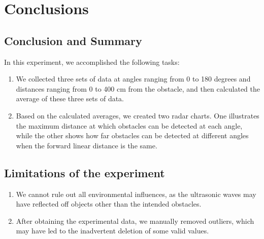\section{Conclusions}
\label{sec:conclusions}
\subsection{Conclusion and Summary}
In this experiment, we accomplished the following tasks:
\begin{enumerate}
  \item We collected three sets of data at angles ranging from 0 to 180 degrees and
    distances ranging from 0 to 400 cm from the obstacle, and then calculated the
    average of these three sets of data.
  \item Based on the calculated averages, we created two radar charts.
    One illustrates the maximum distance at which obstacles can be detected at each angle, while
    the other shows how far obstacles can be detected at different angles when
    the forward linear distance is the same.
\end{enumerate}

\subsection{Limitations of the experiment}
\begin{enumerate}
  \item We cannot rule out all environmental influences, as the ultrasonic waves may
have reflected off objects other than the intended obstacles.
  \item After obtaining the experimental data, we manually removed outliers, which may
have led to the inadvertent deletion of some valid values.
\end{enumerate}
